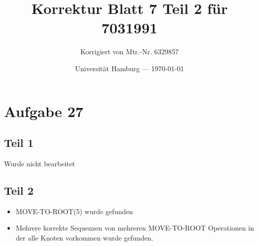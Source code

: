 \documentclass[parskip=half,a4paper]{scrartcl}
\title{Korrektur Blatt 7 Teil 2 für 7031991}
\author{Korrigiert von Mtr.-Nr. 6329857}
\date{Universität Hamburg --- \today}
\begin{document}
\maketitle %

\section{Aufgabe 27}


\subsection{Teil 1}

Wurde nicht bearbeitet

\subsection{Teil 2}

\begin{itemize}
    \item MOVE-TO-ROOT(5) wurde gefunden
    \item Mehrere korrekte Sequenzen von mehreren MOVE-TO-ROOT Operationen in der alle Knoten vorkommen wurde gefunden.
\end{itemize}
\end{document}
